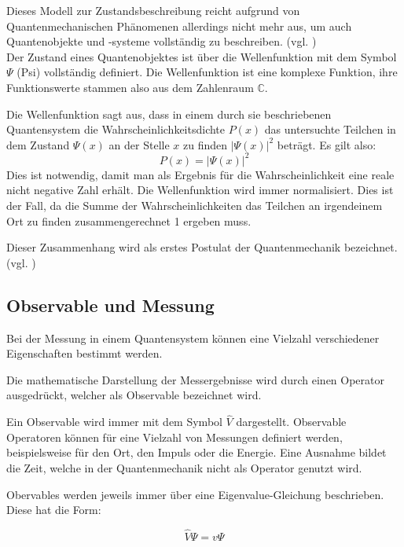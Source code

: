 Dieses Modell zur Zustandsbeschreibung reicht aufgrund von Quantenmechanischen Phänomenen allerdings nicht mehr aus, um auch Quantenobjekte und -systeme vollständig zu beschreiben. (vgl. \cite[Ch. 3.1]{osada_introduction_2022})\\

Der Zustand eines Quantenobjektes ist über die Wellenfunktion mit dem Symbol $\Psi$ (Psi) vollständig definiert. Die Wellenfunktion ist eine komplexe Funktion, ihre Funktionswerte stammen also aus dem Zahlenraum $\mathbb{C}$.


Die Wellenfunktion sagt aus, dass in einem durch sie beschriebenen Quantensystem die Wahrscheinlichkeitsdichte $P(x)$ das untersuchte Teilchen in dem Zustand $\Psi(x)$ an der Stelle $x$ zu finden $|\Psi(x)|^2$ beträgt. Es gilt also:\\
\begin{equation*}
P(x) = |\Psi(x)|^2
\end{equation*}
Dies ist notwendig, damit man als Ergebnis für die Wahrscheinlichkeit eine reale nicht negative Zahl erhält. Die Wellenfunktion wird immer normalisiert. Dies ist der Fall, da die Summe der Wahrscheinlichkeiten das Teilchen an irgendeinem Ort zu finden zusammengerechnet 1 ergeben muss.


Dieser Zusammenhang wird als erstes Postulat der Quantenmechanik bezeichnet. (vgl. \cite[Ch. 1.6]{kasirajan_fundamentals_2021})

\subsection{Observable und Messung}
\label{Observable und Messung}

Bei der Messung in einem Quantensystem können eine Vielzahl verschiedener Eigenschaften bestimmt werden.


Die mathematische Darstellung der Messergebnisse  wird  durch einen Operator ausgedrückt, welcher als Observable bezeichnet wird.


Ein Observable wird immer mit dem Symbol $\hat{V}$ dargestellt.
Observable Operatoren können für eine Vielzahl von Messungen definiert werden, beispielsweise für den Ort, den Impuls oder die Energie. Eine Ausnahme bildet die Zeit, welche in der Quantenmechanik nicht als Operator genutzt wird.


Obervables werden jeweils immer über eine Eigenvalue-Gleichung beschrieben. Diese hat die Form:


\begin{equation*}
\hat{V} \Psi = v \Psi
\end{equation*}


